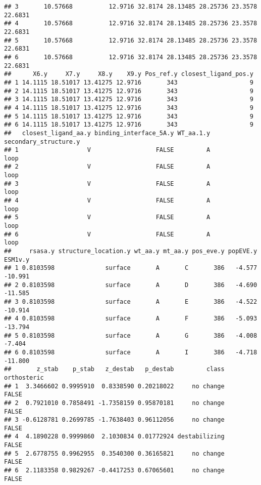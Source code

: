\documentclass[
]{article}
\begin{document}
\begin{verbatim}
## 3       10.57668          12.9716 32.8174 28.13485 28.25736 23.3578 22.6831
## 4       10.57668          12.9716 32.8174 28.13485 28.25736 23.3578 22.6831
## 5       10.57668          12.9716 32.8174 28.13485 28.25736 23.3578 22.6831
## 6       10.57668          12.9716 32.8174 28.13485 28.25736 23.3578 22.6831
##      X6.y     X7.y     X8.y    X9.y Pos_ref.y closest_ligand_pos.y
## 1 14.1115 18.51017 13.41275 12.9716       343                    9
## 2 14.1115 18.51017 13.41275 12.9716       343                    9
## 3 14.1115 18.51017 13.41275 12.9716       343                    9
## 4 14.1115 18.51017 13.41275 12.9716       343                    9
## 5 14.1115 18.51017 13.41275 12.9716       343                    9
## 6 14.1115 18.51017 13.41275 12.9716       343                    9
##   closest_ligand_aa.y binding_interface_5A.y WT_aa.1.y secondary_structure.y
## 1                   V                  FALSE         A                  loop
## 2                   V                  FALSE         A                  loop
## 3                   V                  FALSE         A                  loop
## 4                   V                  FALSE         A                  loop
## 5                   V                  FALSE         A                  loop
## 6                   V                  FALSE         A                  loop
##     rsasa.y structure_location.y wt_aa.y mt_aa.y pos_eve.y popEVE.y ESM1v.y
## 1 0.8103598              surface       A       C       386   -4.577 -10.991
## 2 0.8103598              surface       A       D       386   -4.690 -11.585
## 3 0.8103598              surface       A       E       386   -4.522 -10.914
## 4 0.8103598              surface       A       F       386   -5.093 -13.794
## 5 0.8103598              surface       A       G       386   -4.008  -7.404
## 6 0.8103598              surface       A       I       386   -4.718 -11.800
##       z_stab    p_stab   z_destab   p_destab         class orthosteric
## 1  3.3466602 0.9995910  0.8338590 0.20218022     no change       FALSE
## 2  0.7921010 0.7858491 -1.7358159 0.95870181     no change       FALSE
## 3 -0.6128781 0.2699785 -1.7638403 0.96112056     no change       FALSE
## 4  4.1890228 0.9999860  2.1030834 0.01772924 destabilizing       FALSE
## 5  2.6778755 0.9962955  0.3540300 0.36165821     no change       FALSE
## 6  2.1183358 0.9829267 -0.4417253 0.67065601     no change       FALSE
\end{verbatim}
\end{document}
